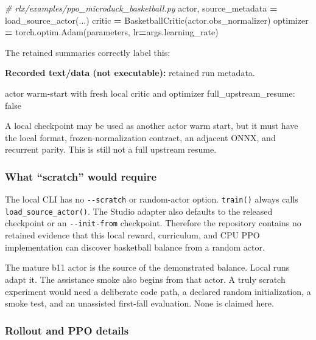 \documentclass[
  american,
  11pt,
  letterpaper,
]{article}
\newenvironment{Shaded}{\begin{snugshade}}{\end{snugshade}}
\newcommand{\CommentTok}[1]{\textcolor[rgb]{0.56,0.35,0.01}{\textit{#1}}}
\newcommand{\NormalTok}[1]{#1}
\newcommand{\OperatorTok}[1]{\textcolor[rgb]{0.81,0.36,0.00}{\textbf{#1}}}
\renewenvironment{Shaded}{\par\smallskip}{\par\smallskip}
\begin{document}
\begin{Shaded}
\begin{Highlighting}[]
\CommentTok{\# rlx/examples/ppo\_microduck\_basketball.py}
\NormalTok{actor, source\_metadata }\OperatorTok{=}\NormalTok{ load\_source\_actor(...)}
\NormalTok{critic }\OperatorTok{=}\NormalTok{ BasketballCritic(actor.obs\_normalizer)}
\NormalTok{optimizer }\OperatorTok{=}\NormalTok{ torch.optim.Adam(parameters, lr}\OperatorTok{=}\NormalTok{args.learning\_rate)}
\end{Highlighting}
\end{Shaded}

The retained summaries correctly label this:

\textbf{Recorded text/data (not executable):} retained run metadata.

\begin{Shaded}
\begin{Highlighting}[]
\NormalTok{actor warm{-}start with fresh local critic and optimizer}
\NormalTok{full\_upstream\_resume: false}
\end{Highlighting}
\end{Shaded}

A local checkpoint may be used as another actor warm start, but it must
have the local format, frozen-normalization contract, an adjacent ONNX,
and recurrent parity. This is still not a full upstream resume.

\subsubsection{What ``scratch'' would
require}\label{what-scratch-would-require}

The local CLI has no \texttt{-\/-scratch} or random-actor option.
\texttt{train()} always calls \texttt{load\_source\_actor()}. The Studio
adapter also defaults to the released checkpoint or an
\texttt{-\/-init-from} checkpoint. Therefore the repository contains no
retained evidence that this local reward, curriculum, and CPU PPO
implementation can discover basketball balance from a random actor.

The mature b11 actor is the source of the demonstrated balance. Local
runs adapt it. The assistance smoke also begins from that actor. A truly
scratch experiment would need a deliberate code path, a declared random
initialization, a smoke test, and an unassisted first-fall evaluation.
None is claimed here.

\subsubsection{Rollout and PPO details}\label{rollout-and-ppo-details}
\end{document}
